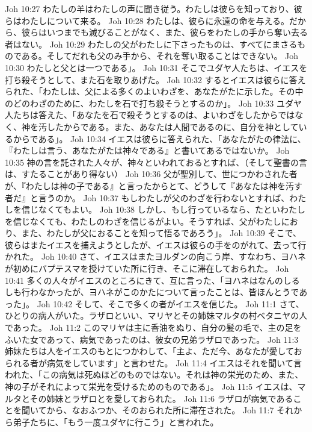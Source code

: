 Joh 10:27  わたしの羊はわたしの声に聞き従う。わたしは彼らを知っており、彼らはわたしについて来る。
Joh 10:28  わたしは、彼らに永遠の命を与える。だから、彼らはいつまでも滅びることがなく、また、彼らをわたしの手から奪い去る者はない。
Joh 10:29  わたしの父がわたしに下さったものは、すべてにまさるものである。そしてだれも父のみ手から、それを奪い取ることはできない。
Joh 10:30  わたしと父とは一つである」。
Joh 10:31  そこでユダヤ人たちは、イエスを打ち殺そうとして、また石を取りあげた。
Joh 10:32  するとイエスは彼らに答えられた、「わたしは、父による多くのよいわざを、あなたがたに示した。その中のどのわざのために、わたしを石で打ち殺そうとするのか」。
Joh 10:33  ユダヤ人たちは答えた、「あなたを石で殺そうとするのは、よいわざをしたからではなく、神を汚したからである。また、あなたは人間であるのに、自分を神としているからである」。
Joh 10:34  イエスは彼らに答えられた、「あなたがたの律法に、『わたしは言う、あなたがたは神々である』と書いてあるではないか。
Joh 10:35  神の言を託された人々が、神々といわれておるとすれば、（そして聖書の言は、すたることがあり得ない）
Joh 10:36  父が聖別して、世につかわされた者が、『わたしは神の子である』と言ったからとて、どうして『あなたは神を汚す者だ』と言うのか。
Joh 10:37  もしわたしが父のわざを行わないとすれば、わたしを信じなくてもよい。
Joh 10:38  しかし、もし行っているなら、たといわたしを信じなくても、わたしのわざを信じるがよい。そうすれば、父がわたしにおり、また、わたしが父におることを知って悟るであろう」。
Joh 10:39  そこで、彼らはまたイエスを捕えようとしたが、イエスは彼らの手をのがれて、去って行かれた。
Joh 10:40  さて、イエスはまたヨルダンの向こう岸、すなわち、ヨハネが初めにバプテスマを授けていた所に行き、そこに滞在しておられた。
Joh 10:41  多くの人々がイエスのところにきて、互に言った、「ヨハネはなんのしるしも行わなかったが、ヨハネがこのかたについて言ったことは、皆ほんとうであった」。
Joh 10:42  そして、そこで多くの者がイエスを信じた。
Joh 11:1  さて、ひとりの病人がいた。ラザロといい、マリヤとその姉妹マルタの村ベタニヤの人であった。
Joh 11:2  このマリヤは主に香油をぬり、自分の髪の毛で、主の足をふいた女であって、病気であったのは、彼女の兄弟ラザロであった。
Joh 11:3  姉妹たちは人をイエスのもとにつかわして、「主よ、ただ今、あなたが愛しておられる者が病気をしています」と言わせた。
Joh 11:4  イエスはそれを聞いて言われた、「この病気は死ぬほどのものではない。それは神の栄光のため、また、神の子がそれによって栄光を受けるためのものである」。
Joh 11:5  イエスは、マルタとその姉妹とラザロとを愛しておられた。
Joh 11:6  ラザロが病気であることを聞いてから、なおふつか、そのおられた所に滞在された。
Joh 11:7  それから弟子たちに、「もう一度ユダヤに行こう」と言われた。
